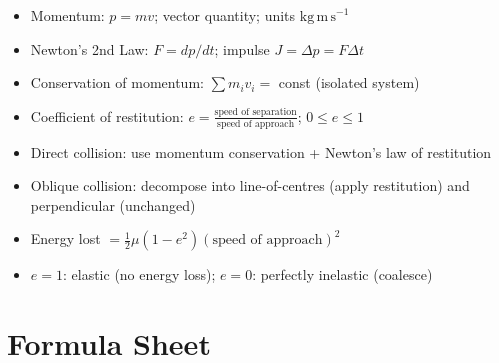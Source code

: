 \documentclass[12pt, a4paper]{book}
\begin{document}
\begin{summarybox}
\begin{itemize}[leftmargin=1.5em]
  \item Momentum: $p = mv$; vector quantity; units $\mathrm{kg\,m\,s}^{-1}$
  \item Newton's 2nd Law: $F = dp/dt$; impulse $J = \Delta p = F\Delta t$
  \item Conservation of momentum: $\sum m_i v_i = $ const (isolated system)
  \item Coefficient of restitution: $e = \frac{\text{speed of separation}}{\text{speed of approach}}$; $0 \leq e \leq 1$
  \item Direct collision: use momentum conservation + Newton's law of restitution
  \item Oblique collision: decompose into line-of-centres (apply restitution) and perpendicular (unchanged)
  \item Energy lost $= \frac{1}{2}\mu(1-e^2)(\text{speed of approach})^2$
  \item $e=1$: elastic (no energy loss); $e=0$: perfectly inelastic (coalesce)
\end{itemize}
\end{summarybox}

\backmatter

\chapter*{Formula Sheet}
\end{document}
